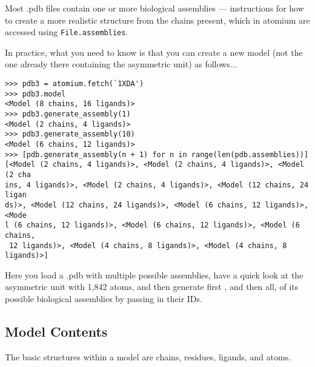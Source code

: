 Most .pdb files contain one or more biological assemblies --- instructions for how
to create a more realistic structure from the chains present, which in atomium
are accessed using \texttt{File.assemblies}.

In practice, what you need to know is that you can create a new model (not the
one already there containing the asymmetric unit) as follows...

\begin{footnotesize}
\begin{verbatim}
>>> pdb3 = atomium.fetch(`1XDA')
>>> pdb3.model
<Model (8 chains, 16 ligands)>
>>> pdb3.generate_assembly(1)
<Model (2 chains, 4 ligands)>
>>> pdb3.generate_assembly(10)
<Model (6 chains, 12 ligands)>
>>> [pdb.generate_assembly(n + 1) for n in range(len(pdb.assemblies))]
[<Model (2 chains, 4 ligands)>, <Model (2 chains, 4 ligands)>, <Model (2 cha
ins, 4 ligands)>, <Model (2 chains, 4 ligands)>, <Model (12 chains, 24 ligan
ds)>, <Model (12 chains, 24 ligands)>, <Model (6 chains, 12 ligands)>, <Mode
l (6 chains, 12 ligands)>, <Model (6 chains, 12 ligands)>, <Model (6 chains,
 12 ligands)>, <Model (4 chains, 8 ligands)>, <Model (4 chains, 8 ligands)>]
\end{verbatim}
\end{footnotesize}

Here you load a .pdb with multiple possible assemblies, have a quick look at
the asymmetric unit with 1,842 atoms, and then generate first , and then all,
of its possible biological assemblies by passing in their IDs.

\subsection{Model Contents}

The basic structures within a model are chains, residues, ligands, and atoms.

